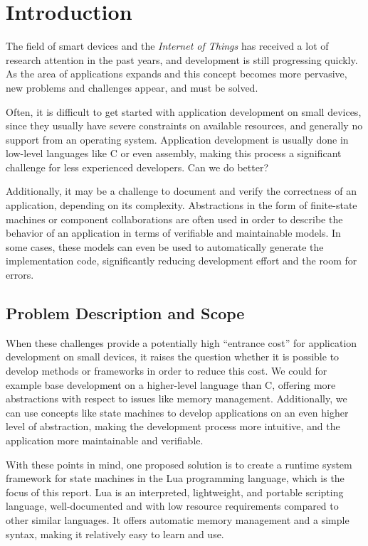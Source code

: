 \chapter{Introduction}
\label{ch:intro}
The field of smart devices and the \emph{Internet of Things} has received a lot of research attention in the past years, and development is still progressing quickly. As the area of applications expands and this concept becomes more pervasive, new problems and challenges appear, and must be solved.

\noindent
Often, it is difficult to get started with application development on small devices, since they usually have severe constraints on available resources, and generally no support from an operating system. Application development is usually done in low-level languages like C or even assembly, making this process a significant challenge for less experienced developers. Can we do better?

\noindent
Additionally, it may be a challenge to document and verify the correctness of an application, depending on its complexity. Abstractions in the form of finite-state machines or component collaborations are often used in order to describe the behavior of an application in terms of verifiable and maintainable models. In some cases, these models can even be used to automatically generate the implementation code, significantly reducing development effort and the room for errors.

\section{Problem Description and Scope}
\label{sec:problem_scope}
When these challenges provide a potentially high ``entrance cost'' for application development on small devices, it raises the question whether it is possible to develop methods or frameworks in order to reduce this cost. We could for example base development on a higher-level language than C, offering more abstractions with respect to issues like memory management. Additionally, we can use concepts like state machines to develop applications on an even higher level of abstraction, making the development process more intuitive, and the application more maintainable and verifiable.

\noindent
With these points in mind, one proposed solution is to create a runtime system framework for state machines in the Lua programming language, which is the focus of this report. Lua is an interpreted, lightweight, and portable scripting language, well-documented and with low resource requirements compared to other similar languages. It offers automatic memory management and a simple syntax, making it relatively easy to learn and use.

